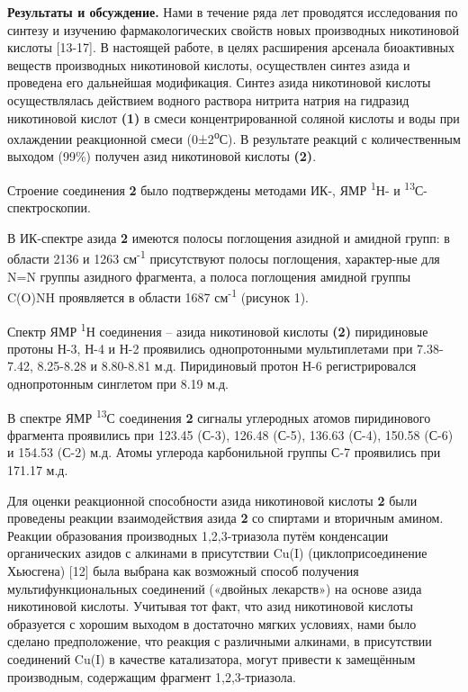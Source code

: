 \begin{multicols}{2}
{\bfseries Результаты и обсуждение.} Нами в течение ряда лет проводятся
исследования по синтезу и изучению фармакологических свойств новых
производных никотиновой кислоты {[}13-17{]}. В настоящей работе, в целях
расширения арсенала биоактивных веществ производных никотиновой кислоты,
осуществлен синтез азида и проведена его дальнейшая модификация. Синтез
азида никотиновой кислоты осуществлялась действием водного раствора
нитрита натрия на гидразид никотиновой кислот {\bfseries (1)} в смеси
концентрированной соляной кислоты и воды при охлаждении реакционной
смеси (0±2\textsuperscript{о}С). В результате реакций с количественным
выходом (99\%) получен азид никотиновой кислоты {\bfseries (2)}.

Строение соединения {\bfseries 2} было подтверждены методами ИК-, ЯМР
\textsuperscript{1}Н- и \textsuperscript{13}С-спектроскопии.

В ИК-спектре азида {\bfseries 2} имеются полосы поглощения азидной и
амидной групп: в области 2136 и 1263 см\textsuperscript{-1} присутствуют
полосы поглощения, характер-ные для N=N группы азидного фрагмента, а
полоса поглощения амидной группы C(O)NH проявляется в области 1687
см\textsuperscript{-1} (рисунок 1).

Спектр ЯМР \textsuperscript{1}Н соединения -- азида никотиновой кислоты
{\bfseries (2)} пиридиновые протоны Н-3, Н-4 и Н-2 проявились
однопротонными мультиплетами при 7.38-7.42, 8.25-8.28 и 8.80-8.81 м.д.
Пиридиновый протон Н-6 регистрировался однопротонным синглетом при 8.19
м.д.

В спектре ЯМР \textsuperscript{13}С соединения {\bfseries 2} сигналы
углеродных атомов пиридинового фрагмента проявились при 123.45 (С-3),
126.48 (С-5), 136.63 (С-4), 150.58 (С-6) и 154.53 (С-2) м.д. Атомы
углерода карбонильной группы С-7 проявились при 171.17 м.д.

Для оценки реакционной способности азида никотиновой кислоты {\bfseries 2}
были проведены реакции взаимодействия азида {\bfseries 2} со спиртами и
вторичным амином. Реакции образования производных 1,2,3-триазола путём
конденсации органических азидов с алкинами в присутствии Cu(I)
(циклоприсоединение Хьюсгена) {[}12{]} была выбрана как возможный способ
получения мультифункциональных соединений («двойных лекарств») на основе
азида никотиновой кислоты. Учитывая тот факт, что азид никотиновой
кислоты образуется с хорошим выходом в достаточно мягких условиях, нами
было сделано предположение, что реакция с различными алкинами, в
присутствии соединений Cu(I) в качестве катализатора, могут привести к
замещённым производным, содержащим фрагмент 1,2,3-триазола.


\end{multicols}
